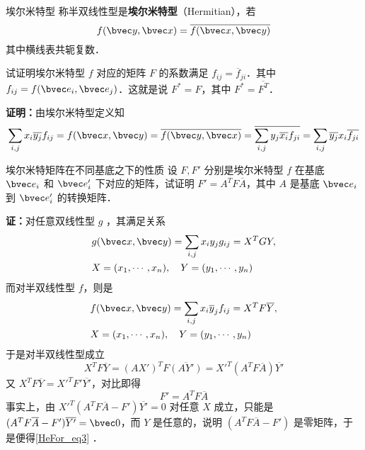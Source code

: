 
\begin{definition}{埃尔米特型}
称半双线性型是\textbf{埃尔米特型}（Hermitian），若
\begin{equation}\label{HeFor_eq2}
f(\bvec y,\bvec x)=\overline{f(\bvec x,\bvec y)}
\end{equation}
其中横线表共轭复数．
\end{definition}
\begin{example}{}
试证明埃尔米特型 $f$ 对应的矩阵 $F$ 的系数满足 $f_{ij}=\overline f_{ji}$．其中 $f_{ij}=f(\bvec e_i,\bvec e_j)$．这就是说 $F^*=F$，其中 $F^*=\overline {F^T}$．

\textbf{证明：}由埃尔米特型定义知
\begin{equation}
\sum_{i,j}x_i\overline{y_j}f_{ij}=f(\bvec x,\bvec y)=\overline{f(\bvec y,\bvec x)}=\overline{\sum_{i,j}y_j \overline{x_i}f_{ji}}=\sum_{i,j}\overline{y_j}{x_i}\overline{f_{ji}}
\end{equation}

\end{example}
\begin{example}{埃尔米特矩阵在不同基底之下的性质}
设 $F,F'$ 分别是埃尔米特型 $f$ 在基底 $\bvec e_i$ 和 $\bvec e'_i$ 下对应的矩阵，试证明 $F'=A^TF\overline A$，其中 $A$ 是基底 $\bvec e_i$ 到 $\bvec e'_i$ 的转换矩阵．

\textbf{证：}对任意双线性型 $g$ ，其满足关系
\begin{equation}
\begin{aligned}
&g(\bvec x,\bvec y)=\sum_{i,j}x_i y_j g_{ij}=X^TGY,\\
&X=(x_1,\cdots,x_n),\quad Y=(y_1,\cdots,y_n)
\end{aligned}
\end{equation}
而对半双线性型 $f$，则是
\begin{equation}\label{HeFor_eq1}
\begin{aligned}
&f(\bvec x,\bvec y)=\sum_{i,j}x_i \overline y_j f_{ij}=X^TF\overline Y,\\
&X=(x_1,\cdots,x_n),\quad Y=(y_1,\cdots,y_n)
\end{aligned}
\end{equation}
于是对半双线性型成立
\begin{equation}
X^TF\overline{Y}=(AX')^TF\overline{(AY')}={X'}^T(A^TF\overline A)\overline{Y'}
\end{equation}
又 $X^T F\overline Y=X'^TF'\overline{Y'}$，对比即得
\begin{equation}\label{HeFor_eq3}
F'=A^TF\overline A
\end{equation}
事实上，由 ${X'}^T(A^TF\overline A-F')\overline{Y'}=0$ 对任意 $X$ 成立，只能是 $(A^TF\overline A-F')\overline{Y'}=\bvec 0$，而 $Y$ 是任意的，说明 $(A^TF\overline A-F')$ 是零矩阵，于是便得\autoref{HeFor_eq3} ．
\end{example}